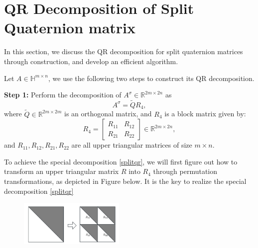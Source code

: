\documentclass[1p]{elsarticle}
\numberwithin{equation}{section}
\begin{document}
\section{QR Decomposition of Split Quaternion matrix}
In this section, we discuss the QR decomposition for split quaternion matrices through construction, and develop an efficient algorithm.

Let $A \in \mathbb{H}^{m \times n}$, we use the following two steps to construct its QR decomposition.  

\textbf{Step 1:} Perform the decomposition of $A^\sigma \in \mathbb{R}^{2m \times 2n}$ as 
\begin{equation}\label{splitqr}
A^\sigma = \widetilde{Q} R_4,
\end{equation} 
where $\widetilde{Q} \in \mathbb{R}^{2m\times 2m}$ is an orthogonal matrix, and $R_4  $ is a block matrix given by:
\begin{equation}\label{r4}
R_4 = \begin{bmatrix}
    R_{11} & R_{12} \\
    R_{21} & R_{22}
\end{bmatrix} \in \mathbb{R}^{2m \times 2n},
\end{equation}
and $R_{11}, R_{12},R_{21},R_{22}$ are all upper triangular matrices of size $m \times n$.

To achieve the special decomposition \eqref{splitqr},  we will first figure out how to transform an upper triangular matrix $R$ into $R_4$ through permutation transformations, as depicted in Figure below. It is the key to realize the special decomposition \eqref{splitqr}
\begin{figure}[htbp]
        \centering
        \includegraphics[width=0.45\textwidth,keepaspectratio=true]{Upper triangular.png} %
         \label{fig:Upper triangular}
\end{figure}
\end{document}
